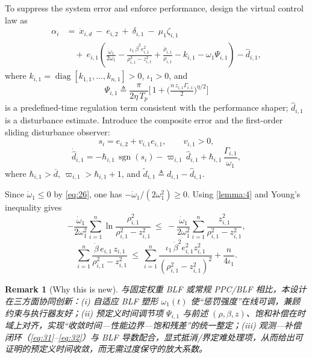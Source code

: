 \documentclass[pdflatex,sn-mathphys-num]{sn-jnl}%
\theoremstyle{thmstyleone}%
\theoremstyle{thmstyletwo}%
\newtheorem{remark}{Remark}%
\theoremstyle{thmstylethree}%
\begin{document}
	To suppress the system error and enforce performance, design the virtual control law as
	\begin{equation}\label{eq:30}
	\begin{aligned}
	\alpha_i
	&=\ \dot x_{i,d}\ -\ e_{i,2}\ +\ \delta_{i,1}\ -\ \mu_1 \zeta_{i,1}\\
	&\quad +\ e_{i,1}\!\left(
	\frac{\dot{\omega}_{1}}{2 \omega_{1}}
	-\frac{\iota_1\,\dot{\beta}^{2} e_{i,1}^{2}}{\rho_{i,1}^{2} - z_{i,1}^{2}}
	+\frac{\dot\rho_{i,1}}{\rho_{i,1}}
	- k_{i,1}
	-\omega_{1}\Psi_{i,1}
	\right)
	-\hat d_{i,1},
	\end{aligned}
	\end{equation}
	where $k_{i,1}=\operatorname{diag}[k_{1,1},\ldots,k_{n,1}]>0$, $\iota_1>0$, and
	\[
	\Psi_{i,1}\triangleq \frac{\pi}{2\eta\,T_p}\Big[\,1+\big(\tfrac{n\,z_{i,1}\Gamma_{i,1}}{2}\big)^{\eta/2}\Big]
	\]
	is a predefined-time regulation term consistent with the performance shaper; $\hat d_{i,1}$ is a disturbance estimate. Introduce the composite error and the first-order sliding disturbance observer:
	\begin{equation}\label{eq:31}
	  s_i=e_{i,2}+v_{i,1}e_{i,1},\qquad v_{i,1}>0,
	\end{equation}
	\begin{equation}\label{eq:32}
	  \dot{\hat d}_{i,1}
	  =-\hbar_{i,1}\,\operatorname{sgn}(s_i)-\varpi_{i,1}\,\hat d_{i,1}
	  +\hbar_{i,1}\,\frac{\Gamma_{i,1}}{\omega_{1}},
	\end{equation}
	where $\hbar_{i,1}>\bar d$, $\varpi_{i,1}>\hbar_{i,1}+1$, and $\tilde d_{i,1}\triangleq d_{i,1}-\hat d_{i,1}$.
	
	Since $\dot{\omega}_1\le 0$ by \eqref{eq:26}, one has $-\dot{\omega}_1/(2\omega_1^2)\ge 0$. Using \cref{lemma:4} and Young's inequality gives
	\begin{equation}\label{eq:33}
	-\frac{\dot{\omega}_{1}}{2 \omega_{1}^{2}}\sum_{i=1}^{n}\ln\frac{\rho_{i,1}^{2}}{\rho_{i,1}^{2}-z_{i,1}^{2}}
	\ \le\
	-\frac{\dot{\omega}_{1}}{2 \omega_{1}^{2}}\sum_{i=1}^{n}\frac{z_{i,1}^{2}}{\rho_{i,1}^{2}-z_{i,1}^{2}},
	\end{equation}
	\begin{equation}\label{eq:34}
	\sum_{i=1}^{n} \frac{\dot{\beta}\, e_{i,1}\, z_{i,1}}{\rho_{i,1}^{2} - z_{i,1}^{2}}
	\ \le\
	\sum_{i=1}^{n}\frac{\iota_{1}\,\dot{\beta}^{2} e_{i,1}^{2} z_{i,1}^{2}}{(\rho_{i,1}^{2}-z_{i,1}^{2})^{2}}
	+\frac{n}{4\iota_{1}}.
	\end{equation}
	
	\begin{remark}[Why this is new]
	与固定权重 BLF 或常规 PPC/BLF 相比，本设计在三方面协同创新：\emph{(i)} 自适应 BLF 塑形 $\omega_1(t)$ 使“惩罚强度”在线可调，兼顾约束与执行器友好；\emph{(ii)} 预定义时间调节项 $\Psi_{i,1}$ 与前述 $(\rho,\beta,z)$、饱和补偿在时域上对齐，实现“收敛时间—性能边界—饱和残差”的统一整定；\emph{(iii)} 观测—补偿闭环（\eqref{eq:31}–\eqref{eq:32}）与 BLF 导数配合，显式抵消/界定难处理项，从而给出可证明的预定义时间收敛，而无需过度保守的放大系数。
	\end{remark}
	
\end{document}
